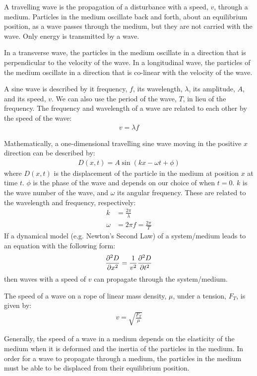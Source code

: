 \begin{chapterSummary}
A travelling wave is the propagation of a disturbance with a speed, $v$, through a medium. Particles in the medium oscillate back and forth, about an equilibrium position, as a wave passes through the medium, but they are not carried with the wave. Only energy is transmitted by a wave.

In a transverse wave, the particles in the medium oscillate in a direction that is perpendicular to the velocity of the wave. In a longitudinal wave, the particles of the medium oscillate in a direction that is co-linear with the velocity of the wave.

A sine wave is described by it frequency, $f$, its wavelength, $\lambda$, its amplitude, $A$, and its speed, $v$. We can also use the period of the wave, $T$, in lieu of the frequency. The frequency and wavelength of a wave are related to each other by the speed of the wave:
\begin{align*}
v = \lambda f
\end{align*}

Mathematically, a one-dimensional travelling sine wave moving in the positive $x$ direction can be described by:
\begin{align*}
D(x,t) = A \sin(kx-\omega t + \phi)
\end{align*}
where $D(x,t)$ is the displacement of the particle in the medium at position $x$ at time $t$. $\phi$ is the phase of the wave and depends on our choice of when $t=0$. $k$ is the wave number of the wave, and $\omega$ its angular frequency. These are related to the wavelength and frequency, respectively:
\begin{align*}
k &= \frac{2\pi}{\lambda}\\
\omega &= 2\pi f = \frac{2\pi}{T}
\end{align*}
If a dynamical model (e.g. Newton's Second Law) of a system/medium leads to an equation with the following form:
\begin{align*}
\frac{\partial ^2D}{\partial x^2}=\frac{1}{v^2}\frac{\partial ^2D}{\partial t^2}
\end{align*}
then waves with a speed of $v$ can propagate through the system/medium.

The speed of a wave on a rope of linear mass density, $\mu$, under a tension, $F_T$, is given by:
\begin{align*}
v=\sqrt{\frac{F_T}{\mu}}
\end{align*}

Generally, the speed of a wave in a medium depends on the elasticity of the medium when it is deformed and the inertia of the particles in the medium. In order for a wave to propagate through a medium, the particles in the medium must be able to be displaced from their equilibrium position.


\end{chapterSummary}

